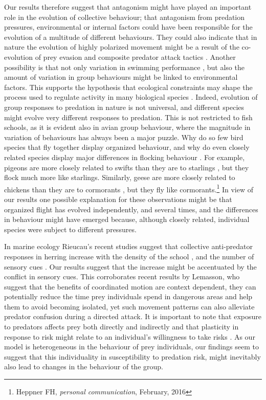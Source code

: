 Our results therefore suggest that antagonism might have played an important role in the evolution of collective behaviour; that antagonism from predation pressures, environmental or internal factors could have been responsible for the evolution of a multitude of different behaviours. They could also indicate that in nature the evolution of highly polarized movement might be a result of the co-evolution of prey evasion and composite predator attack tactics \cite{demsar2015simulating}. Another possibility is that not only variation in swimming performance \cite{oufiero2016evolution}, but also the amount of variation in group behaviours might be linked to environmental factors. This supports the hypothesis that ecological constraints may shape the process used to regulate activity in many biological species \cite{gordon2014ecology}. Indeed, evolution of group responses to predation in nature is not universal, and different species might evolve very different responses to predation. This is not restricted to fish schools, as it is evident also in avian group behaviour, where the magnitude in variation of behaviours has always been a major puzzle. Why do so few bird species that fly together display organized behaviour, and why do even closely related species display major differences in flocking behaviour \cite{lebarbajec2009organized}. For example, pigeons are more closely related to swifts than they are to starlings \cite{jarvis2014wholegenome}, but they flock much more like starlings. Similarly, geese are more closely related to chickens than they are to cormorants \cite{jarvis2014wholegenome}, but they fly like cormorants.\footnote{Heppner FH, \emph{personal communication}, February, 2016} In view of our results one possible explanation for these observations might be that organized flight has evolved independently, and several times, and the differences in behaviour might have emerged because, although closely related, individual species were subject to different pressures.

In marine ecology Rieucau\etal's recent studies suggest that collective anti-predator responses in herring increase with the density of the school \cite{rieucau2014School}, and the number of sensory cues \cite{rieucau2014experimental,rieucau2015herring}. Our results suggest that the increase might be accentuated by the conflict in sensory cues. This corroborates recent results by Lemasson\etal \cite{lemasson2016sensory}, who suggest that the benefits of coordinated motion are context dependent, \ie they can potentially reduce the time prey individuals spend in dangerous areas and help them to avoid becoming isolated, yet such movement patterns can also alleviate predator confusion during a directed attack. It is important to note that exposure to predators affects prey both directly and indirectly and that plasticity in response to risk might relate to an individual's willingness to take risks \cite{abbeylee2016behavioral}. As our model is heterogeneous in the behaviour of prey individuals, our findings seem to suggest that this individuality in susceptibility to predation risk, might inevitably also lead to changes in the behaviour of the group.

